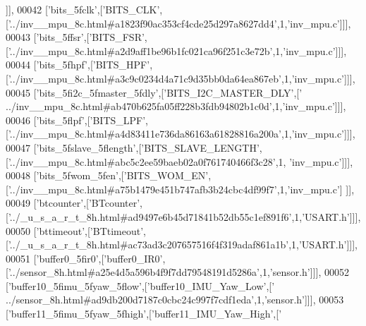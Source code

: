 \begin{DoxyCode}
      ]],
00042   [\textcolor{stringliteral}{'bits\_5fclk'},[\textcolor{stringliteral}{'BITS\_CLK'},[\textcolor{stringliteral}{'../inv\_\_mpu\_8c.html#a1823f90ac353cf4cde25d297a8627dd4'},1,\textcolor{stringliteral}{'inv\_mpu.c'}]]],
00043   [\textcolor{stringliteral}{'bits\_5ffsr'},[\textcolor{stringliteral}{'BITS\_FSR'},[\textcolor{stringliteral}{'../inv\_\_mpu\_8c.html#a2d9aff1be96b1fc021ca96f251c3e72b'},1,\textcolor{stringliteral}{'inv\_mpu.c'}]]],
00044   [\textcolor{stringliteral}{'bits\_5fhpf'},[\textcolor{stringliteral}{'BITS\_HPF'},[\textcolor{stringliteral}{'../inv\_\_mpu\_8c.html#a3c9c0234d4a71c9d35bb0da64ea867eb'},1,\textcolor{stringliteral}{'inv\_mpu.c'}]]],
00045   [\textcolor{stringliteral}{'bits\_5fi2c\_5fmaster\_5fdly'},[\textcolor{stringliteral}{'BITS\_I2C\_MASTER\_DLY'},[\textcolor{stringliteral}{'
      ../inv\_\_mpu\_8c.html#ab470b625fa05ff228b3fdb94802b1c0d'},1,\textcolor{stringliteral}{'inv\_mpu.c'}]]],
00046   [\textcolor{stringliteral}{'bits\_5flpf'},[\textcolor{stringliteral}{'BITS\_LPF'},[\textcolor{stringliteral}{'../inv\_\_mpu\_8c.html#a4d83411e736da86163a61828816a200a'},1,\textcolor{stringliteral}{'inv\_mpu.c'}]]],
00047   [\textcolor{stringliteral}{'bits\_5fslave\_5flength'},[\textcolor{stringliteral}{'BITS\_SLAVE\_LENGTH'},[\textcolor{stringliteral}{'../inv\_\_mpu\_8c.html#abc5c2ee59baeb02a0f761740466f3c28'},1,\textcolor{stringliteral}{
      'inv\_mpu.c'}]]],
00048   [\textcolor{stringliteral}{'bits\_5fwom\_5fen'},[\textcolor{stringliteral}{'BITS\_WOM\_EN'},[\textcolor{stringliteral}{'../inv\_\_mpu\_8c.html#a75b1479e451b747afb3b24cbc4df99f7'},1,\textcolor{stringliteral}{'inv\_mpu.c'}]
      ]],
00049   [\textcolor{stringliteral}{'btcounter'},[\textcolor{stringliteral}{'BTcounter'},[\textcolor{stringliteral}{'../\_u\_s\_a\_r\_t\_8h.html#ad9497e6b45d71841b52db55c1ef891f6'},1,\textcolor{stringliteral}{'USART.h'}]]],
00050   [\textcolor{stringliteral}{'bttimeout'},[\textcolor{stringliteral}{'BTtimeout'},[\textcolor{stringliteral}{'../\_u\_s\_a\_r\_t\_8h.html#ac73ad3c207657516f4f319adaf861a1b'},1,\textcolor{stringliteral}{'USART.h'}]]],
00051   [\textcolor{stringliteral}{'buffer0\_5fir0'},[\textcolor{stringliteral}{'buffer0\_IR0'},[\textcolor{stringliteral}{'../sensor\_8h.html#a25e4d5a596b4f9f7dd79548191d5286a'},1,\textcolor{stringliteral}{'sensor.h'}]]],
00052   [\textcolor{stringliteral}{'buffer10\_5fimu\_5fyaw\_5flow'},[\textcolor{stringliteral}{'buffer10\_IMU\_Yaw\_Low'},[\textcolor{stringliteral}{'
      ../sensor\_8h.html#ad9db200d7187c0cbc24c997f7cdf1eda'},1,\textcolor{stringliteral}{'sensor.h'}]]],
00053   [\textcolor{stringliteral}{'buffer11\_5fimu\_5fyaw\_5fhigh'},[\textcolor{stringliteral}{'buffer11\_IMU\_Yaw\_High'},[\textcolor{stringliteral}{'
}
\end{DoxyCode}
